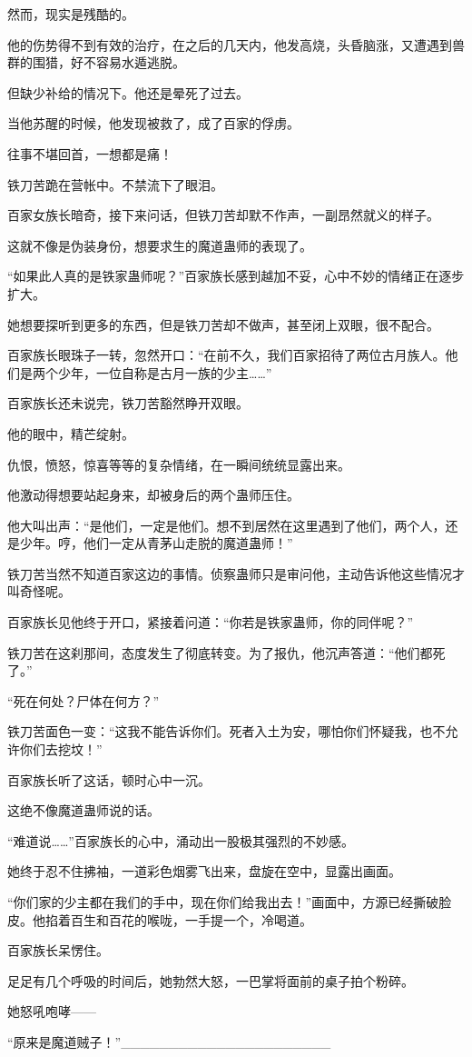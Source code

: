 \begin{this_body}
然而，现实是残酷的。

他的伤势得不到有效的治疗，在之后的几天内，他发高烧，头昏脑涨，又遭遇到兽群的围猎，好不容易水遁逃脱。

但缺少补给的情况下。他还是晕死了过去。

当他苏醒的时候，他发现被救了，成了百家的俘虏。

往事不堪回首，一想都是痛！

铁刀苦跪在营帐中。不禁流下了眼泪。

百家女族长暗奇，接下来问话，但铁刀苦却默不作声，一副昂然就义的样子。

这就不像是伪装身份，想要求生的魔道蛊师的表现了。

“如果此人真的是铁家蛊师呢？”百家族长感到越加不妥，心中不妙的情绪正在逐步扩大。

她想要探听到更多的东西，但是铁刀苦却不做声，甚至闭上双眼，很不配合。

百家族长眼珠子一转，忽然开口：“在前不久，我们百家招待了两位古月族人。他们是两个少年，一位自称是古月一族的少主……”

百家族长还未说完，铁刀苦豁然睁开双眼。

他的眼中，精芒绽射。

仇恨，愤怒，惊喜等等的复杂情绪，在一瞬间统统显露出来。

他激动得想要站起身来，却被身后的两个蛊师压住。

他大叫出声：“是他们，一定是他们。想不到居然在这里遇到了他们，两个人，还是少年。哼，他们一定从青茅山走脱的魔道蛊师！”

铁刀苦当然不知道百家这边的事情。侦察蛊师只是审问他，主动告诉他这些情况才叫奇怪呢。

百家族长见他终于开口，紧接着问道：“你若是铁家蛊师，你的同伴呢？”

铁刀苦在这刹那间，态度发生了彻底转变。为了报仇，他沉声答道：“他们都死了。”

“死在何处？尸体在何方？”

铁刀苦面色一变：“这我不能告诉你们。死者入土为安，哪怕你们怀疑我，也不允许你们去挖坟！”

百家族长听了这话，顿时心中一沉。

这绝不像魔道蛊师说的话。

“难道说……”百家族长的心中，涌动出一股极其强烈的不妙感。

她终于忍不住拂袖，一道彩色烟雾飞出来，盘旋在空中，显露出画面。

“你们家的少主都在我们的手中，现在你们给我出去！”画面中，方源已经撕破脸皮。他掐着百生和百花的喉咙，一手提一个，冷喝道。

百家族长呆愣住。

足足有几个呼吸的时间后，她勃然大怒，一巴掌将面前的桌子拍个粉碎。

她怒吼咆哮——

“原来是魔道贼子！”\_\_\_\_\_\_\_\_\_\_\_\_\_\_\_\_\_\_\_\_\_\_

\end{this_body}

